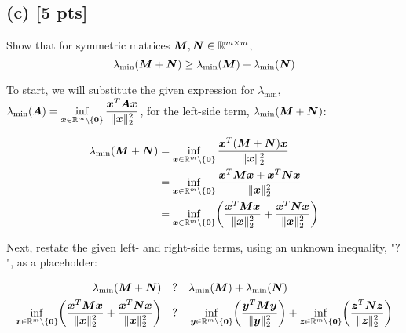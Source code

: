 \documentclass[twoside,10pt]{article}
\newcommand{\q}{\quad?\quad}
\begin{document}
\subsection*{(c) [5 pts]}

Show that for symmetric matrices $\bm{M}, \bm{N} \in \mathbb{R}^{m \times m}$, 
\begin{equation}
  \lambda_{\mathrm{min}}(\mtx{M} + \mtx{N}) \geq \lambda_{\mathrm{min}}\left(\mtx{M}\right) + \lambda_{\mathrm{min}}\left(\mtx{N}\right)
\end{equation}

To start, we will substitute the given expression for $\lambda_{\mathrm{min}}$, $\lambda_{\mathrm{min}}\left(\mtx{A}\right) = \inf \limits_{\vct{x} \in \R^m \setminus \{\vct{0}\}} \dfrac{\vct{x}^T \mtx{A}\vct{x}}{\|\vct{x}\|_2^2}$, for the left-side term, $\lambda_{\mathrm{min}}(\bm{M} + \bm{N})$:

\begin{align*}
  \lambda_{\mathrm{min}}(\mtx{M} + \mtx{N}) &= \inf \limits_{\vct{x} \in \R^m \setminus \{\vct{0}\}} \dfrac{\vct{x}^T \left(\mtx{M} + \mtx{N}\right)\vct{x}}{\|\vct{x}\|_2^2}\\
  &= \inf \limits_{\vct{x} \in \R^m \setminus \{\vct{0}\}} \dfrac{\vct{x}^T \mtx{M}\vct{x} + \vct{x}^T\mtx{N}\vct{x}}{\|\vct{x}\|_2^2}\\
  &= \inf \limits_{\vct{x} \in \R^m \setminus \{\vct{0}\}} \left(\dfrac{\vct{x}^T \mtx{M}\vct{x} }{\|\vct{x}\|_2^2} + \dfrac{\vct{x}^T\mtx{N}\vct{x}}{\|\vct{x}\|_2^2}\right)\\
\end{align*}

Next, restate the given left- and right-side terms, using an unknown inequality, "$?$", as a placeholder:

\begin{align*}
  \lambda_{\mathrm{min}}(\mtx{M} + \mtx{N}) &\q \lambda_{\mathrm{min}}\left(\mtx{M}\right) + \lambda_{\mathrm{min}}\left(\mtx{N}\right)\\
  \inf \limits_{\vct{x} \in \R^m \setminus \{\vct{0}\}} \left(\dfrac{\vct{x}^T \mtx{M}\vct{x} }{\|\vct{x}\|_2^2} + \dfrac{\vct{x}^T\mtx{N}\vct{x}}{\|\vct{x}\|_2^2}\right) &\q  \inf \limits_{\vct{y} \in \R^m \setminus \{\vct{0}\}} \left(\dfrac{\vct{y}^T \mtx{M}\vct{y}}{\|\vct{y}\|_2^2}\right) + \inf \limits_{\vct{z} \in \R^m \setminus \{\vct{0}\}} \left(\dfrac{\vct{z}^T \mtx{N}\vct{z}}{\|\vct{z}\|_2^2}\right)\\
\end{align*}
\end{document}
